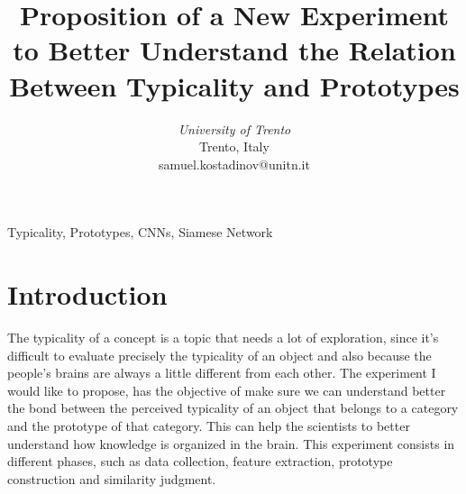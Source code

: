 \documentclass[conference]{IEEEtran}
\begin{document}
\title{Proposition of a New Experiment to Better Understand the Relation Between Typicality and Prototypes}



\author{
\textit{University of Trento}\\
Trento, Italy \\
samuel.kostadinov@unitn.it}


\maketitle

\begin{abstract}

	

\end{abstract}

\begin{IEEEkeywords}
Typicality, Prototypes, CNNs, Siamese Network
\end{IEEEkeywords}










\section{Introduction}
	
	The typicality of a concept is a topic that needs a lot of exploration, since it's difficult to evaluate precisely the typicality of an object 
	and also because the people's brains are always a little different from each other. The experiment I would like to propose, has the objective of 
	make sure we can understand better the bond between the perceived typicality of an object that belongs to a category and the prototype of that category.
	This can help the scientists to better understand how knowledge is organized in the brain. This experiment consists in different phases, such as
	data collection, feature extraction, prototype construction and similarity judgment.




	
\end{document}
